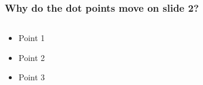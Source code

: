 \documentclass[10pt,aspectratio=169]{beamer}
\begin{document}
    \begin{frame}
      \frametitle{Why do the dot points move on slide 2?}
      \begin{columns}
          \begin{column}{0.5\textwidth}
          \begin{itemize}
              \item Point 1
              \item Point 2
              \item<3-> Point 3
          \end{itemize}
        \end{column}
        \begin{column}{0.5\textwidth}
        \end{column}
      \end{columns}
    \end{frame}
\end{document}
